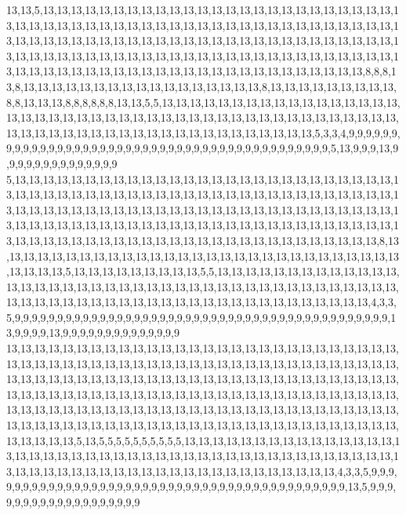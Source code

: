 13,13,5,13,13,13,13,13,13,13,13,13,13,13,13,13,13,13,13,13,13,13,13,13,13,13,13,13,13,13,13,13,13,13,13,13,13,13,13,13,13,13,13,13,13,13,13,13,13,13,13,13,13,13,13,13,13,13,13,13,13,13,13,13,13,13,13,13,13,13,13,13,13,13,13,13,13,13,13,13,13,13,13,13,13,13,13,13,13,13,13,13,13,13,13,13,13,13,13,13,13,13,13,13,13,13,13,13,13,13,13,13,13,13,13,13,13,13,13,13,13,13,13,13,13,13,13,13,13,13,13,13,13,13,13,13,13,13,8,8,8,13,8,13,13,13,13,13,13,13,13,13,13,13,13,13,13,13,13,13,8,13,13,13,13,13,13,13,13,13,8,8,13,13,13,8,8,8,8,8,8,13,13,5,5,13,13,13,13,13,13,13,13,13,13,13,13,13,13,13,13,13,13,13,13,13,13,13,13,13,13,13,13,13,13,13,13,13,13,13,13,13,13,13,13,13,13,13,13,13,13,13,13,13,13,13,13,13,13,13,13,13,13,13,13,13,13,13,13,13,13,13,5,3,3,4,9,9,9,9,9,9,9,9,9,9,9,9,9,9,9,9,9,9,9,9,9,9,9,9,9,9,9,9,9,9,9,9,9,9,9,9,9,9,9,9,9,9,9,9,5,13,9,9,9,13,9,9,9,9,9,9,9,9,9,9,9,9,9,9
5,13,13,13,13,13,13,13,13,13,13,13,13,13,13,13,13,13,13,13,13,13,13,13,13,13,13,13,13,13,13,13,13,13,13,13,13,13,13,13,13,13,13,13,13,13,13,13,13,13,13,13,13,13,13,13,13,13,13,13,13,13,13,13,13,13,13,13,13,13,13,13,13,13,13,13,13,13,13,13,13,13,13,13,13,13,13,13,13,13,13,13,13,13,13,13,13,13,13,13,13,13,13,13,13,13,13,13,13,13,13,13,13,13,13,13,13,13,13,13,13,13,13,13,13,13,13,13,13,13,13,13,13,13,13,13,13,13,13,8,13,13,13,13,13,13,13,13,13,13,13,13,13,13,13,13,13,13,13,13,13,13,13,13,13,13,13,13,13,13,13,13,13,5,13,13,13,13,13,13,13,13,13,5,5,13,13,13,13,13,13,13,13,13,13,13,13,13,13,13,13,13,13,13,13,13,13,13,13,13,13,13,13,13,13,13,13,13,13,13,13,13,13,13,13,13,13,13,13,13,13,13,13,13,13,13,13,13,13,13,13,13,13,13,13,13,13,13,13,13,13,13,4,3,3,5,9,9,9,9,9,9,9,9,9,9,9,9,9,9,9,9,9,9,9,9,9,9,9,9,9,9,9,9,9,9,9,9,9,9,9,9,9,9,9,9,9,9,9,9,13,9,9,9,9,13,9,9,9,9,9,9,9,9,9,9,9,9,9,9
13,13,13,13,13,13,13,13,13,13,13,13,13,13,13,13,13,13,13,13,13,13,13,13,13,13,13,13,13,13,13,13,13,13,13,13,13,13,13,13,13,13,13,13,13,13,13,13,13,13,13,13,13,13,13,13,13,13,13,13,13,13,13,13,13,13,13,13,13,13,13,13,13,13,13,13,13,13,13,13,13,13,13,13,13,13,13,13,13,13,13,13,13,13,13,13,13,13,13,13,13,13,13,13,13,13,13,13,13,13,13,13,13,13,13,13,13,13,13,13,13,13,13,13,13,13,13,13,13,13,13,13,13,13,13,13,13,13,13,13,13,13,13,13,13,13,13,13,13,13,13,13,13,13,13,13,13,13,13,13,13,13,13,13,13,13,13,13,13,13,13,13,13,5,13,5,5,5,5,5,5,5,5,5,5,13,13,13,13,13,13,13,13,13,13,13,13,13,13,13,13,13,13,13,13,13,13,13,13,13,13,13,13,13,13,13,13,13,13,13,13,13,13,13,13,13,13,13,13,13,13,13,13,13,13,13,13,13,13,13,13,13,13,13,13,13,13,13,13,13,13,13,4,3,3,5,9,9,9,9,9,9,9,9,9,9,9,9,9,9,9,9,9,9,9,9,9,9,9,9,9,9,9,9,9,9,9,9,9,9,9,9,9,9,9,9,9,9,9,13,5,9,9,9,9,9,9,9,9,9,9,9,9,9,9,9,9,9,9,9
